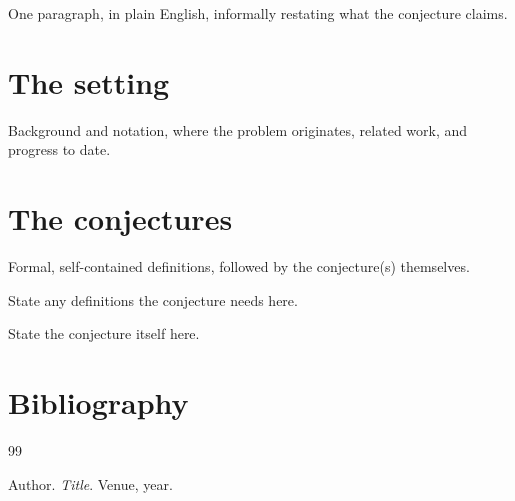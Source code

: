 \documentclass{aicr-conjecture}
\begin{document}

\vspace{0.4em}

\begin{informalconjecture}
One paragraph, in plain English, informally restating what the
conjecture claims.
\end{informalconjecture}

\section{The setting}\label{sec:setting}

Background and notation, where the problem originates, related
work, and progress to date.

\section{The conjectures}\label{sec:conjectures}

Formal, self-contained definitions, followed by the conjecture(s)
themselves.

\begin{definition}[name]\label{def:example}
State any definitions the conjecture needs here.
\end{definition}

\begin{conjecture}[name]\label{conj:main}
State the conjecture itself here.
\end{conjecture}

\section{Bibliography}

\begin{aicrbibliography}{99}

Author.
\emph{Title}.
Venue, year.

\end{aicrbibliography}
\end{document}
